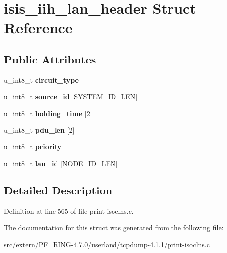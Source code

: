 \hypertarget{structisis__iih__lan__header}{
\section{isis\_\-iih\_\-lan\_\-header Struct Reference}
\label{structisis__iih__lan__header}
}
\subsection*{Public Attributes}
\begin{DoxyCompactItemize}
\item 
\hypertarget{structisis__iih__lan__header_a7effee2ecb2ccc8a6d227a3f9c322f7a}{
u\_\-int8\_\-t {\bfseries circuit\_\-type}}
\label{structisis__iih__lan__header_a7effee2ecb2ccc8a6d227a3f9c322f7a}

\item 
\hypertarget{structisis__iih__lan__header_a8628a64d52dd536e8cbfbb7a3933f80c}{
u\_\-int8\_\-t {\bfseries source\_\-id} \mbox{[}SYSTEM\_\-ID\_\-LEN\mbox{]}}
\label{structisis__iih__lan__header_a8628a64d52dd536e8cbfbb7a3933f80c}

\item 
\hypertarget{structisis__iih__lan__header_a70d8d79beadd995abb222375116f4d53}{
u\_\-int8\_\-t {\bfseries holding\_\-time} \mbox{[}2\mbox{]}}
\label{structisis__iih__lan__header_a70d8d79beadd995abb222375116f4d53}

\item 
\hypertarget{structisis__iih__lan__header_a57108a72bbb04ddbe8b155428430dba4}{
u\_\-int8\_\-t {\bfseries pdu\_\-len} \mbox{[}2\mbox{]}}
\label{structisis__iih__lan__header_a57108a72bbb04ddbe8b155428430dba4}

\item 
\hypertarget{structisis__iih__lan__header_ab1a8a57f7f76b681c2b4e5ac32810f40}{
u\_\-int8\_\-t {\bfseries priority}}
\label{structisis__iih__lan__header_ab1a8a57f7f76b681c2b4e5ac32810f40}

\item 
\hypertarget{structisis__iih__lan__header_a70765d753aa4b1b1b5ad838b28e5f578}{
u\_\-int8\_\-t {\bfseries lan\_\-id} \mbox{[}NODE\_\-ID\_\-LEN\mbox{]}}
\label{structisis__iih__lan__header_a70765d753aa4b1b1b5ad838b28e5f578}

\end{DoxyCompactItemize}


\subsection{Detailed Description}


Definition at line 565 of file print-\/isoclns.c.



The documentation for this struct was generated from the following file:\begin{DoxyCompactItemize}
\item 
src/extern/PF\_\-RING-\/4.7.0/userland/tcpdump-\/4.1.1/print-\/isoclns.c\end{DoxyCompactItemize}
